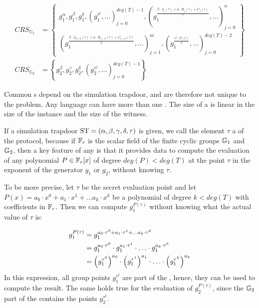 \begin{definition}
\begin{align*}
\label{def:groth16-crs}
CRS_{\mathbb{G}_{1}} &= \textstyle\left\{ \begin{array}{c}
g_1^\alpha,g_1^\beta,g_1^\delta,\left(g_1^{\tau^j},\ldots\right)_{j=0}^{deg(T)-1},
\left(g_1^{\frac{\beta\cdot A_{j}(\tau)+\alpha\cdot B_{j}(\tau)+C_{j}(\tau)}{\gamma}},\ldots\right)_{j=0}^n\\
\left(g_1^{\frac{\beta\cdot A_{j+n}(\tau)+\alpha\cdot B_{j+n}(\tau)+C_{j+n}(\tau)}{\delta}},\ldots\right)_{j=1}^m,\left(g_1^{\frac{\tau^{j}\cdot T(\tau)}{\delta}},\ldots\right)_{j=0}^{deg(T)-2}
\end{array}\right\} \\
CRS_{\mathbb{G}_{2}} &= \left\{g_2^\beta ,g_2^\gamma,g_2^\delta,\left(g_2^{\tau^j},\ldots\right) _{j=0}^{deg(T)-1}\right\}
\end{align*}
\end{definition}

Common s depend on the simulation trapdoor, and are therefore not unique to the problem. Any language can have more than one . The  size of a  is linear in the size of the instance and the size of the witness.

If a simulation trapdoor $\mathrm{ST} = (\alpha,\beta,\gamma,\delta, \tau)$ is given, we call the element $\tau$ a  of the protocol, because if $\mathbb{F}_r$ is the scalar field of the finite cyclic groups $\mathbb{G}_1$ and $\mathbb{G}_2$, then a key feature of any  is that it provides data to compute the evaluation of any polynomial $P\in \mathbb{F}_r[x]$ of degree $deg(P)<deg(T)$ at the point $\tau$ in the exponent of the generator $g_1$ or $g_2$, without knowing $\tau$.

To be more precise, let $\tau$ be the secret evaluation point and let $P(x)=a_0\cdot x^0 + a_1\cdot x^1 + \ldots a_k\cdot x^k$ be a polynomial of degree $k<deg(T)$ with coefficients in $\mathbb{F}_r$. Then we can compute $g_1^{P(\tau)}$ without knowing what the actual value of $\tau$ is:

\label{eq:exp_evaluation-poly}
\begin{align}
g_1^{P(\tau)} & = g_1^{a_0\cdot \tau^0 + a_1\cdot \tau^1 + \ldots a_k\cdot \tau^k} \notag\\
 & = g_1^{a_0\cdot \tau^0} \cdot g_1^{a_1\cdot \tau^1} \cdot \ldots \cdot g_1^{a_k\cdot \tau^k}\notag\\
 & = \Big(g_1^{\tau^0}\Big)^{a_0} \cdot \Big(g_1^{\tau^1}\Big)^{a_1} \cdot \ldots \cdot \Big(g_1^{\tau^k}\Big)^{a_k}
\end{align}
In this expression, all group points $g_1^{\tau^j}$ are part of the , hence, they can be used to compute the result. The same holds true for the evaluation of $g_2^{P(\tau)}$, since the $\mathbb{G}_2$ part of the  contains the points $g_2^{\tau^j}$. 

